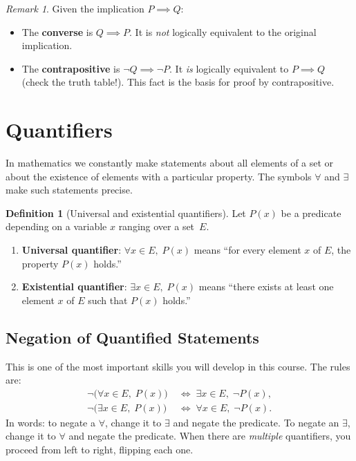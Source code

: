 \documentclass[12pt,a4paper,openany]{book}
\theoremstyle{definition}
\newtheorem{definition}{Definition}[chapter]
\theoremstyle{remark}
\newtheorem{remark}{Remark}[chapter]
\begin{document}
\begin{remark}\label{rem:converse-contrapositive}
Given the implication $P \implies Q$:
\begin{itemize}
  \item The \textbf{converse} is $Q \implies P$.  It is
    \emph{not} logically equivalent to the original implication.
  \item The \textbf{contrapositive} is $\neg Q
    \implies \neg P$.  It \emph{is} logically equivalent to $P \implies Q$
    (check the truth table!).  This fact is the basis for proof by
    contrapositive.
\end{itemize}
\end{remark}

\section{Quantifiers}
\label{sec:quantifiers}

In mathematics we constantly make statements about all elements of a set or
about the existence of elements with a particular property.  The symbols
$\forall$ and $\exists$ make such statements precise.

\begin{definition}[Universal and existential quantifiers]\label{def:quantifiers}
Let $P(x)$ be a predicate depending on a variable $x$ ranging over a set~$E$.
\begin{enumerate}[label=(\roman*)]
  \item \textbf{Universal quantifier}:
    $\forall x \in E,\; P(x)$ means ``for every element $x$ of $E$,
    the property $P(x)$ holds.''
  \item \textbf{Existential quantifier}:
    $\exists x \in E,\; P(x)$ means ``there exists at least one element
    $x$ of $E$ such that $P(x)$ holds.''
\end{enumerate}
\end{definition}

\subsection{Negation of Quantified Statements}
\label{subsec:negation-quantifiers}

This is one of the most important skills you will develop in this course.
The rules are:
\begin{align}
  \neg\bigl(\forall x \in E,\; P(x)\bigr)
    &\;\iff\; \exists x \in E,\; \neg P(x),
    \label{eq:neg-forall} \\
  \neg\bigl(\exists x \in E,\; P(x)\bigr)
    &\;\iff\; \forall x \in E,\; \neg P(x).
    \label{eq:neg-exists}
\end{align}
In words: to negate a $\forall$, change it to $\exists$ and negate the
predicate.  To negate an $\exists$, change it to $\forall$ and negate the
predicate.  When there are \emph{multiple} quantifiers, you proceed from
left to right, flipping each one.
\end{document}
